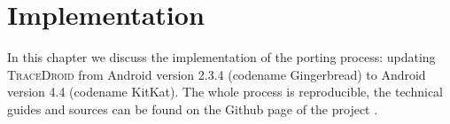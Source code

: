\chapter{Implementation}
\label{chap:implementation}

In this chapter we discuss the implementation of the porting process:
updating \textsc{TraceDroid} from Android version 2.3.4 (codename Gingerbread)
to Android version 4.4 (codename KitKat). The whole process is
reproducible, the technical guides and sources can be found on the
Github page of the project \cite{ref15}.
